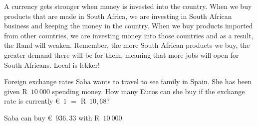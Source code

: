 A currency gets stronger when money is invested into the country. When we buy products that are made in South Africa, we are investing in South African business and keeping the money in the country. When we buy products imported from other countries, we are investing money into those countries and as a result, the Rand will weaken. Remember, the more South African products we buy, the greater demand there will be for them, meaning that more jobs will open for South Africans. Local is lekker!


\begin{wex}{Foreign exchange rates}
    {Saba wants to travel to see family in Spain. She has been given R~$10~000$ spending money. How many Euros can she buy if the exchange rate is currently €~$1$ $=$ R~$10,68$?}{
    
    Saba can buy €~$936,33$ with R~$10~000$.
}
\end{wex}


